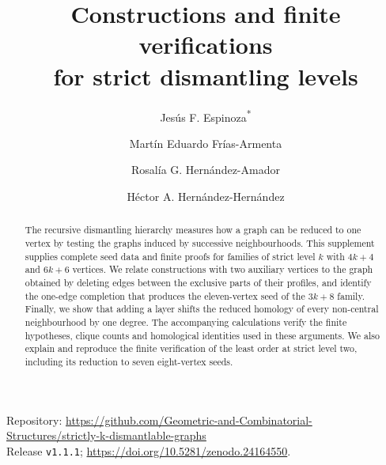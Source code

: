 \documentclass[11pt]{amsart}
\title[Constructions and finite verifications]{Constructions and finite verifications\\for strict dismantling levels}
\author[J. F. Espinoza]{Jes\'us F. Espinoza\textsuperscript{*}}
\author[M. E. Fr\'ias-Armenta]{Mart\'in Eduardo Fr\'ias-Armenta}
\author[R. G. Hern\'andez-Amador]{Rosal\'ia G. Hern\'andez-Amador}
\author[H. A. Hern\'andez-Hern\'andez]{H\'ector A. Hern\'andez-Hern\'andez}
\date{}
\begin{document}
\begin{abstract}
The recursive dismantling hierarchy measures how a graph can be reduced to one
vertex by testing the graphs induced by successive neighbourhoods. This
supplement supplies complete seed data and finite proofs for families of
strict level $k$ with $4k+4$ and $6k+6$ vertices. We relate constructions with
two auxiliary vertices to the graph obtained by deleting edges between the
exclusive parts of their profiles, and identify the one-edge completion that
produces the eleven-vertex seed of the $3k+8$ family. Finally, we show that
adding a layer shifts the reduced homology of every non-central neighbourhood
by one degree. The accompanying calculations verify the finite hypotheses,
clique counts and homological identities used in these arguments. We also
explain and reproduce the finite verification of the least order at strict
level two, including its reduction to seven eight-vertex seeds.
\end{abstract}
\maketitle
\raggedbottom
\begin{center}\small
Repository: \url{https://github.com/Geometric-and-Combinatorial-Structures/strictly-k-dismantlable-graphs}\\
Release \texttt{v1.1.1}; \url{https://doi.org/10.5281/zenodo.24164550}.
\end{center}
\tableofcontents








\appendix

\FloatBarrier


\end{document}

